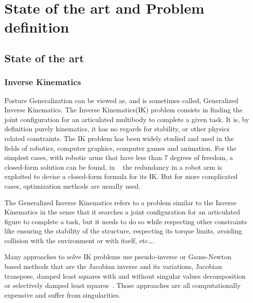 
\chapter{State of the art and Problem definition}
\label{cha:state_of_the_art_and_problem_definition}

\section{State of the art}
\label{sec:state_of_the_art}

\subsection{Inverse Kinematics}
\label{sub:inverse_kinematics}

Posture Generalization can be viewed as, and is sometimes called, Generalized Inverse Kinematics.
The Inverse Kinematics(IK) problem consists in finding the joint configuration for an articulated multibody to complete a given task.
It is, by definition purely kinematics, it has no regards for stability, or other physics related constraints.
The IK problem has been widely studied and used in the fields of robotics, computer graphics, computer games and animation.
For the simplest cases, with robotic arms that have less than 7 degrees of freedom, a closed-form solution can be found, in ~\cite{asfour2003human} the redundancy in a robot arm is exploited to devise a closed-form formula for its IK.
But for more complicated cases, optimization methods are usually used.

The Generalized Inverse Kinematics refers to a problem similar to the Inverse Kinematics in the sense that it searches a joint configuration for an articulated figure to complete a task, but it needs to do so while respecting other constraints like ensuring the stability of the structure, respecting its torque limits, avoiding collision with the environment or with itself, etc\ldots.



Many approaches to solve IK problems use pseudo-inverse or Gauss-Newton based methods that are the Jacobian inverse and its variations, Jacobian transpose, damped least squares with and without singular values decomposition or selectively damped least squares~\cite{balestrino1984robust, tolani2000real, baillieul1985kinematic, wampler1986manipulator, nakamura1986inverse, buss2005selectively}.
Those approaches are all computationally expensive and suffer from singularities.

